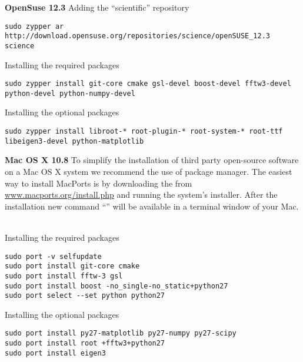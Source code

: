 \noindent
{\large\bf OpenSuse 12.3} \newline
Adding the ``scientific'' repository 
\begin{lstlisting}[language=shell, style=commandline]
sudo zypper ar http://download.opensuse.org/repositories/science/openSUSE_12.3 science
\end{lstlisting}

\noindent
Installing the required packages
\begin{lstlisting}[language=shell, style=commandline]
sudo zypper install git-core cmake gsl-devel boost-devel fftw3-devel python-devel python-numpy-devel
\end{lstlisting}

\noindent
Installing the optional packages
\begin{lstlisting}[language=shell, style=commandline]
sudo zypper install libroot-* root-plugin-* root-system-* root-ttf libeigen3-devel python-matplotlib
\end{lstlisting}
\vspace*{3mm}



\noindent
\noindent
{\large\bf Mac OS X 10.8} \newline
To simplify the installation of third party open-source software on a Mac OS X system we recommend the use of  package manager. 
The easiest way to install MacPorts is by downloading the  
from \url{www.macports.org/install.php} and running the system's installer.
After the installation new command ``'' will be available
in a terminal window of your Mac. \


\noindent
Installing the required packages
\begin{lstlisting}[language=shell, style=commandline]
sudo port -v selfupdate
sudo port install git-core cmake
sudo port install fftw-3 gsl
sudo port install boost -no_single-no_static+python27 
sudo port select --set python python27
\end{lstlisting}

\noindent
Installing the optional packages
\begin{lstlisting}[language=shell, style=commandline]
sudo port install py27-matplotlib py27-numpy py27-scipy
sudo port install root +fftw3+python27
sudo port install eigen3
\end{lstlisting}




